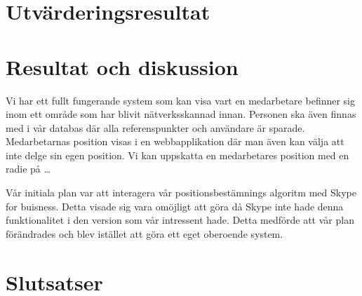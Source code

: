 \documentclass[swedish, a4paper,12pt]{article}
\begin{document}
\section{Utvärderingsresultat}

\section{Resultat och diskussion}

Vi har ett fullt fungerande system som kan visa vart en medarbetare befinner sig inom ett område som har blivit nätverksskannad innan. Personen ska även finnas med i vår databas där alla referenspunkter och användare är sparade. Medarbetarnas position visas i en webbapplikation där man även kan välja att inte delge sin egen position. Vi kan uppskatta en medarbetares position med en radie på \ldots %

Vår initiala plan var att interagera vår positionsbestämnings algoritm med Skype for buisness. Detta visade sig vara omöjligt att göra då Skype inte hade denna funktionalitet i den version som vår intressent hade. Detta medförde att vår plan förändrades och blev istället att göra ett eget oberoende system.


\section{Slutsatser}

\end{document}
